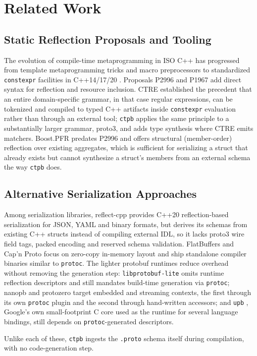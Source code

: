 \section{Related Work}

\subsection{Static Reflection Proposals and Tooling}
The evolution of compile-time metaprogramming in ISO C++ has progressed from template metaprogramming tricks and macro preprocessors to standardized \texttt{constexpr} facilities in C++14/17/20 \cite{p1240}. Proposals P2996 \cite{p2996} and P1967 \cite{p1967} add direct syntax for reflection and resource inclusion. CTRE \cite{ctre} established the precedent that an entire domain-specific grammar, in that case regular expressions, can be tokenized and compiled to typed C++ artifacts inside \texttt{constexpr} evaluation rather than through an external tool; \texttt{ctpb} applies the same principle to a substantially larger grammar, proto3, and adds type synthesis where CTRE emits matchers. Boost.PFR \cite{boost_pfr} predates P2996 and offers structural (member-order) reflection over existing aggregates, which is sufficient for serializing a struct that already exists but cannot synthesize a struct's members from an external schema the way \texttt{ctpb} does.

\subsection{Alternative Serialization Approaches}
Among serialization libraries, reflect-cpp \cite{reflect_cpp} provides C++20 reflection-based serialization for JSON, YAML and binary formats, but derives its schemas from existing C++ structs instead of compiling external IDL, so it lacks proto3 wire field tags, packed encoding and reserved schema validation. FlatBuffers \cite{flatbuffers} and Cap'n Proto \cite{capnproto} focus on zero-copy in-memory layout and ship standalone compiler binaries similar to \texttt{protoc}. The lighter protobuf runtimes reduce overhead without removing the generation step: \texttt{libprotobuf-lite} omits runtime reflection descriptors and still mandates build-time generation via \texttt{protoc}; nanopb \cite{nanopb} and protozero \cite{protozero} target embedded and streaming contexts, the first through its own \texttt{protoc} plugin and the second through hand-written accessors; and \texttt{upb} \cite{upb}, Google's own small-footprint C core used as the runtime for several language bindings, still depends on \texttt{protoc}-generated descriptors.

Unlike each of these, \texttt{ctpb} ingests the \texttt{.proto} schema itself during compilation, with no code-generation step.
